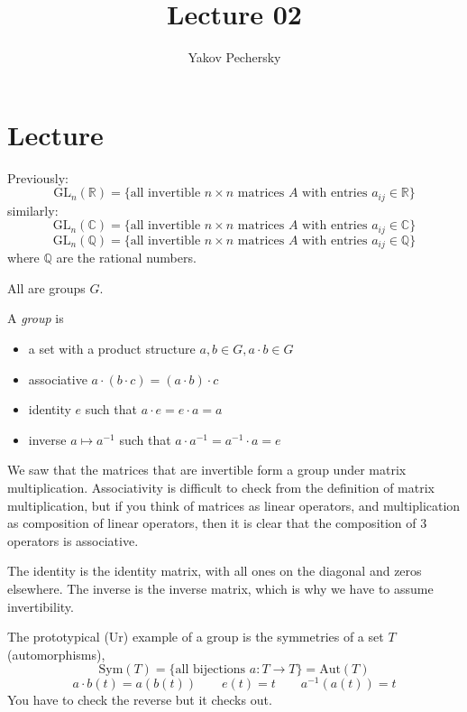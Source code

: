 \documentclass[12pt]{article}
\newcommand{\RR}{\mathbb{R}}
\newcommand{\GL}{\text{GL}}
\newcommand{\inv}[1]{#1^{-1}}
\theoremstyle{definition}
\begin{document}
\author{Yakov Pechersky}

\title{Lecture 02}

\maketitle

\section*{Lecture}

Previously: \[\GL_n (\RR) = \{ \text{all invertible } n \times n \text{ matrices } A \text{ with entries } a_{ij} \in \RR \} \] 
similarly:
\[\GL_n (\mathbb{C}) = \{ \text{all invertible } n \times n \text{ matrices } A \text{ with entries } a_{ij} \in \mathbb{C} \} \]
\[\GL_n (\mathbb{Q}) = \{ \text{all invertible } n \times n \text{ matrices } A \text{ with entries } a_{ij} \in \mathbb{Q} \} \]
where \(\mathbb{Q}\) are the rational numbers.

All are groups \(G\).

A \emph{group} is \begin{itemize} \setlength\itemsep{0em}
    \item a set with a product structure \(a, b \in G, a \cdot b \in G\)
    \item associative \(a \cdot (b \cdot c) = (a \cdot b) \cdot c\)
    \item identity \(e\) such that \(a \cdot e = e \cdot a = a\)
    \item inverse \(a \mapsto \inv{a}\) such that \(a \cdot \inv{a} = \inv{a} \cdot a = e\)
\end{itemize}

We saw that the matrices that are invertible form a group under matrix multiplication.
Associativity is difficult to check from the definition of matrix multiplication, but
if you think of matrices as linear operators, and multiplication as composition of linear
operators, then it is clear that the composition of 3 operators is associative.

The identity is the identity matrix, with all ones on the diagonal and zeros elsewhere.
The inverse is the inverse matrix, which is why we have to assume invertibility.

The prototypical (Ur) example of a group is the symmetries of a set \(T\) (automorphisms),
\[\text{Sym}(T) = \{\text{all bijections } a : T \to T \} = \text{Aut}(T) \]
\[ a \cdot b (t) = a(b(t)) \qquad e(t) = t \qquad \inv{a}(a(t)) = t\]
You have to check the reverse but it checks out.
\end{document}
